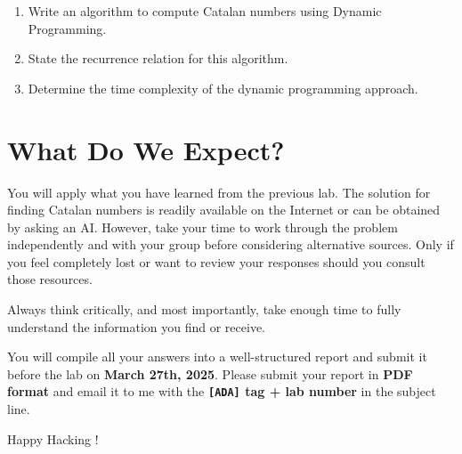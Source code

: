 \documentclass[11pt]{article}
\begin{document}
\begin{tcolorbox}[title=Exercises]
    \begin{enumerate}
        \item Write an algorithm to compute Catalan numbers using Dynamic Programming.
        \item State the recurrence relation for this algorithm.
        \item Determine the time complexity of the dynamic programming approach.
    \end{enumerate}
\end{tcolorbox}

\section{What Do We Expect?}

You will apply what you have learned from the previous lab. The solution for finding Catalan numbers is readily available on the Internet or can be obtained by asking an AI. However, take your time to work through the problem independently and with your group before considering alternative sources. Only if you feel completely lost or want to review your responses should you consult those resources.

Always think critically, and most importantly, take enough time to fully understand the information you find or receive.

You will compile all your answers into a well-structured report and submit it before the lab on \textbf{March 27th, 2025}. Please submit your report in \textbf{PDF format} and email it to me with the \textbf{\texttt{[ADA]} tag + lab number} in the subject line.

\vspace{5mm}
Happy Hacking !
\end{document}
